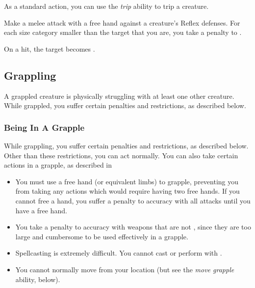          As a standard action, you can use the \textit{trip} ability to trip a creature.

        \begin{freeability}{}
            Make a melee attack with a free hand against a creature's Reflex defenses.
            For each size category smaller than the target that you are, you take a  penalty to .

            On a hit, the target becomes \prone.
        \end{freeability}

    \subsection{Grappling}\label{Grappling}
        A grappled creature is physically struggling with at least one other creature.
        While grappled, you suffer certain penalties and restrictions, as described below.

        \subsubsection{Being In A Grapple}
            While grappling, you suffer certain penalties and restrictions, as described below. Other than these restrictions, you can act normally. You can also take certain actions in a grapple, as described in 
            \begin{itemize}
                \item You must use a free hand (or equivalent limbs) to grapple, preventing you from taking any actions which would require having two free hands.
                    If you cannot free a hand, you suffer a  penalty to accuracy with all  attacks until you have a free hand.
                \item You take a  penalty to accuracy with weapons that are not , since they are too large and cumbersome to be used effectively in a grapple.
                \item Spellcasting is extremely difficult. You cannot cast  or perform  with .
                \item You cannot normally move from your location (but see the \textit{move grapple} ability, below).
            \end{itemize}

